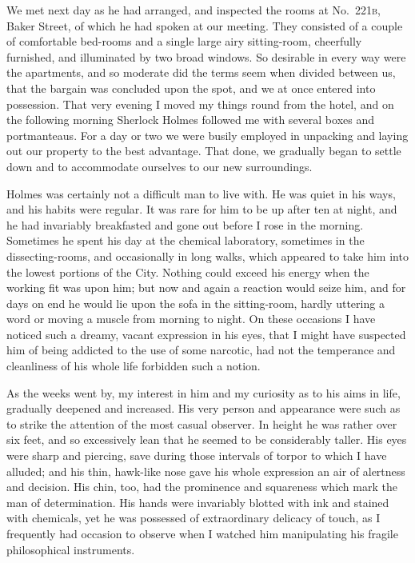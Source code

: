 \documentclass[12pt,english]{book}
\newcommand{\noun}[1]{\textsc{#1}}
\begin{document}

We met next day as he had arranged, and inspected the rooms at No.\ \noun{221b},
Baker Street, of which he had spoken at our meeting. They consisted
of a couple of comfortable bed-rooms and a single large airy sitting-room,
cheerfully furnished, and illuminated by two broad windows. So desirable
in every way were the apartments, and so moderate did the terms seem
when divided between us, that the bargain was concluded upon the spot,
and we at once entered into possession. That very evening I moved
my things round from the hotel, and on the following morning Sherlock
Holmes followed me with several boxes and portmanteaus. For a day
or two we were busily employed in unpacking and laying out our property
to the best advantage. That done, we gradually began to settle down
and to accommodate ourselves to our new surroundings.

Holmes was certainly not a difficult man to live with. He was quiet
in his ways, and his habits were regular. It was rare for him to be
up after ten at night, and he had invariably breakfasted and gone
out before I rose in the morning. Sometimes he spent his day at the
chemical laboratory, sometimes in the dissecting-rooms, and occasionally
in long walks, which appeared to take him into the lowest portions
of the City. Nothing could exceed his energy when the working fit
was upon him; but now and again a reaction would seize him, and for
days on end he would lie upon the sofa in the sitting-room, hardly
uttering a word or moving a muscle from morning to night. On these
occasions I have noticed such a dreamy, vacant expression in his eyes,
that I might have suspected him of being addicted to the use of some
narcotic, had not the temperance and cleanliness of his whole life
forbidden such a notion.

As the weeks went by, my interest in him and my curiosity as to his
aims in life, gradually deepened and increased. His very person and
appearance were such as to strike the attention of the most casual
observer. In height he was rather over six feet, and so excessively
lean that he seemed to be considerably taller. His eyes were sharp
and piercing, save during those intervals of torpor to which I have
alluded; and his thin, hawk-like nose gave his whole expression an
air of alertness and decision. His chin, too, had the prominence and
squareness which mark the man of determination. His hands were invariably
blotted with ink and stained with chemicals, yet he was possessed
of extraordinary delicacy of touch, as I frequently had occasion to
observe when I watched him manipulating his fragile philosophical
instruments.
\end{document}
